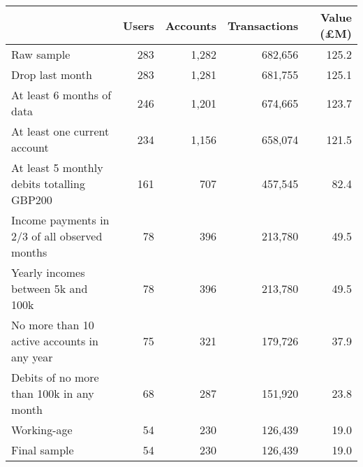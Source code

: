 \begin{tabular}{lrrrr}
\toprule
                                              & Users & Accounts & Transactions & Value (\pounds M) \\
\midrule
                                   Raw sample &   283 &    1,282 &      682,656 &             125.2 \\
                              Drop last month &   283 &    1,281 &      681,755 &             125.1 \\
                    At least 6 months of data &   246 &    1,201 &      674,665 &             123.7 \\
                 At least one current account &   234 &    1,156 &      658,074 &             121.5 \\
   At least 5 monthly debits totalling GBP200 &   161 &      707 &      457,545 &              82.4 \\
Income payments in 2/3 of all observed months &    78 &      396 &      213,780 &              49.5 \\
           Yearly incomes between 5k and 100k &    78 &      396 &      213,780 &              49.5 \\
  No more than 10 active accounts in any year &    75 &      321 &      179,726 &              37.9 \\
     Debits of no more than 100k in any month &    68 &      287 &      151,920 &              23.8 \\
                                  Working-age &    54 &      230 &      126,439 &              19.0 \\
                                 Final sample &    54 &      230 &      126,439 &              19.0 \\
\bottomrule
\end{tabular}
